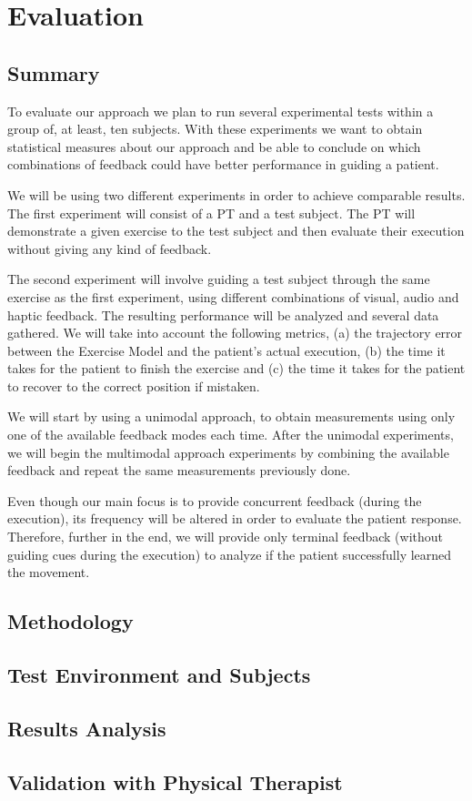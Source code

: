 \chapter{Evaluation}
\label{sec:evaluation}

\section*{Summary}
To evaluate our approach we plan to run several experimental tests within a group of, at least, ten subjects. 
With these experiments we want to obtain statistical measures about our approach and be able to conclude 
on which combinations of feedback could have better performance in guiding a patient.

We will be using two different experiments in order to achieve comparable results. 
The first experiment will consist of a \ac{PT} and a test subject. 
The \ac{PT} will demonstrate a given exercise to the test subject and then evaluate their execution without giving any kind of feedback. 

The second experiment will involve guiding a test subject through the same exercise as the first experiment, 
using different combinations of visual, audio and haptic feedback.
The resulting performance will be analyzed and several data gathered. 
We will take into account the following metrics, (a) the trajectory error between the Exercise Model and 
the patient's actual execution, (b) the time it takes for the patient to finish the exercise 
and (c) the time it takes for the patient to recover to the correct position if mistaken.

We will start by using a unimodal approach, to obtain measurements using only one of the 
available feedback modes each time. After the unimodal experiments, we will begin the multimodal 
approach experiments by combining the available feedback and repeat the same measurements previously done.

Even though our main focus is to provide concurrent feedback (during the execution), its frequency will be altered in order to evaluate the patient response. Therefore, further in the end, we will provide only terminal feedback (without guiding cues during the execution) to analyze if the patient successfully learned the movement.

\section{Methodology}

\section{Test Environment and Subjects}

\section{Results Analysis}

\section{Validation with Physical Therapist}